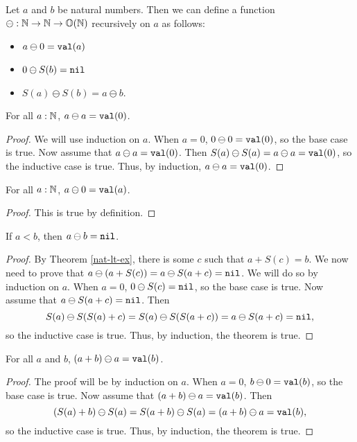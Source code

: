 \documentclass[../math.tex]{subfiles}
\begin{document}
\begin{definition}
    Let $a$ and $b$ be natural numbers.  Then we can define a function $\ominus
    : \mathbb{N} \rightarrow \mathbb{N} \rightarrow \mathbb{O}(\mathbb{N})$ recursively on $a$ as
    follows:
    \begin{itemize}
        \item $a \ominus 0 = \val a$
        \item $0 \ominus S(b) = \nil$
        \item $S(a) \ominus S(b) = a \ominus b$.
    \end{itemize}
\end{definition}

\begin{theorem} \label{nat-minus-eq}
    For all $a : \mathbb{N}$, $a \ominus a = \val 0$.
\end{theorem}
\begin{proof}
    We will use induction on $a$.  When $a = 0$, $0 \ominus 0 = \val 0$,
    so the base case is true.  Now assume that $a \ominus a = \val 0$.  Then
    $S(a) \ominus S(a) = a \ominus a = \val 0$, so the inductive case is true.
    Thus, by induction, $a \ominus a = \val 0$.
\end{proof}

\begin{theorem} \label{nat-minus-zero}
    For all $a : \mathbb{N}$, $a \ominus 0 = \val a$.
\end{theorem}
\begin{proof}
    This is true by definition.
\end{proof}

\begin{theorem} \label{nat-minus-lt}
    If $a < b$, then $a \ominus b = \nil$.
\end{theorem}
\begin{proof}
    By Theorem \ref{nat-lt-ex}, there is some $c$ such that $a + S(c) = b$.  We
    now need to prove that $a \ominus (a + S(c)) = a \ominus S(a + c) = \nil$.
    We will do so by induction on $a$.  When $a = 0$, $0 \ominus S(c) = \nil$,
    so the base case is true.  Now assume that $a \ominus S(a + c) = \nil$.
    Then
    \[
        S(a) \ominus S(S(a) + c) = S(a) \ominus S(S(a + c)) = a \ominus S(a + c)
        = \nil,
    \]
    so the inductive case is true.  Thus, by induction, the theorem is true.
\end{proof}

\begin{theorem} \label{nat-minus-plus}
    For all $a$ and $b$, $(a + b) \ominus a = \val b$.
\end{theorem}
\begin{proof}
    The proof will be by induction on $a$.  When $a = 0$, $b \ominus 0 = \val
    b$, so the base case is true.  Now assume that $(a + b) \ominus a = \val b$.
    Then
    \[
        (S(a) + b) \ominus S(a) = S(a + b) \ominus S(a) = (a + b) \ominus a =
        \val b,
    \]
    so the inductive case is true.  Thus, by induction, the theorem is true.
\end{proof}
\end{document}

